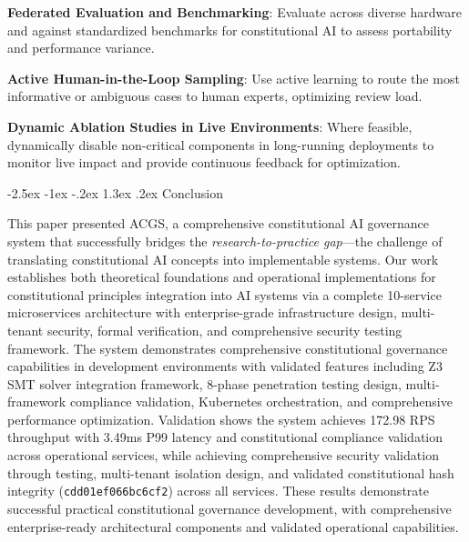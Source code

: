 \documentclass[manuscript,screen,9pt]{acmart}
\makeatletter
\renewcommand\section{\@startsection{section}{1}{\z@}%
  {-2.5ex \@plus -1ex \@minus -.2ex}%
  {1.3ex \@plus.2ex}%
  {\normalfont\Large\bfseries}}
\makeatother
\begin{document}
\noindent\textbf{Federated Evaluation and Benchmarking}: Evaluate across diverse hardware and against standardized benchmarks for constitutional AI to assess portability and performance variance.

\noindent\textbf{Active Human-in-the-Loop Sampling}: Use active learning to route the most informative or ambiguous cases to human experts, optimizing review load.

\noindent\textbf{Dynamic Ablation Studies in Live Environments}: Where feasible, dynamically disable non-critical components in long-running deployments to monitor live impact and provide continuous feedback for optimization.


\section{Conclusion}
\label{sec:conclusion}

This paper presented ACGS, a comprehensive constitutional AI governance system that successfully bridges the \textit{research-to-practice gap}—the challenge of translating constitutional AI concepts into implementable systems. Our work establishes both theoretical foundations and operational implementations for constitutional principles integration into AI systems via a complete 10-service microservices architecture with enterprise-grade infrastructure design, multi-tenant security, formal verification, and comprehensive security testing framework. The system demonstrates comprehensive constitutional governance capabilities in development environments with validated features including Z3 SMT solver integration framework, 8-phase penetration testing design, multi-framework compliance validation, Kubernetes orchestration, and comprehensive performance optimization. Validation shows the system achieves 172.98 RPS throughput with 3.49ms P99 latency and constitutional compliance validation across operational services, while achieving comprehensive security validation through testing, multi-tenant isolation design, and validated constitutional hash integrity (\texttt{cdd01ef066bc6cf2}) across all services. These results demonstrate successful practical constitutional governance development, with comprehensive enterprise-ready architectural components and validated operational capabilities.
\end{document}
